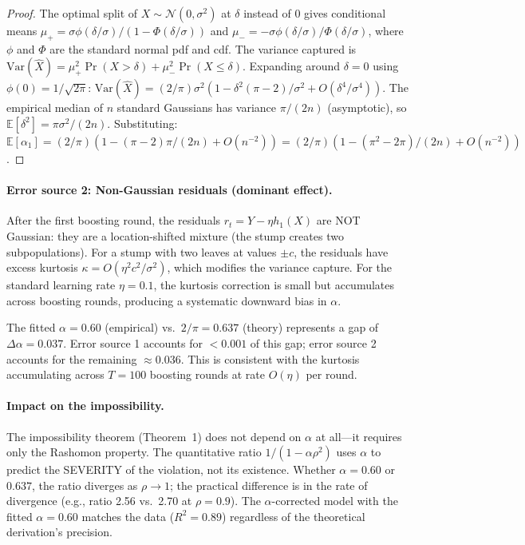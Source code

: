 \documentclass{article}
\newcommand{\Var}{\mathrm{Var}}
\begin{document}
\begin{proof}
The optimal split of $X \sim \mathcal{N}(0, \sigma^2)$ at $\delta$
instead of $0$ gives conditional means
$\mu_+ = \sigma\phi(\delta/\sigma)/(1-\Phi(\delta/\sigma))$ and
$\mu_- = -\sigma\phi(\delta/\sigma)/\Phi(\delta/\sigma)$, where
$\phi$ and $\Phi$ are the standard normal pdf and cdf.
The variance captured is
$\Var(\hat{X}) = \mu_+^2 \Pr(X > \delta) + \mu_-^2 \Pr(X \leq \delta)$.
Expanding around $\delta = 0$ using $\phi(0) = 1/\sqrt{2\pi}$:
$\Var(\hat{X}) = (2/\pi)\sigma^2(1 - \delta^2(\pi-2)/\sigma^2 + O(\delta^4/\sigma^4))$.
The empirical median of $n$ standard Gaussians has variance
$\pi/(2n)$ (asymptotic), so $\mathbb{E}[\delta^2] = \pi\sigma^2/(2n)$.
Substituting: $\mathbb{E}[\alpha_1] = (2/\pi)(1 - (\pi-2)\pi/(2n) + O(n^{-2}))
= (2/\pi)(1 - (\pi^2-2\pi)/(2n) + O(n^{-2}))$.
\end{proof}

\paragraph{Error source 2: Non-Gaussian residuals (dominant effect).}
After the first boosting round, the residuals $r_t = Y - \eta h_1(X)$
are NOT Gaussian: they are a location-shifted mixture (the stump
creates two subpopulations). For a stump with two leaves at values
$\pm c$, the residuals have excess kurtosis
$\kappa = O(\eta^2 c^2/\sigma^2)$, which modifies the variance
capture. For the standard learning rate $\eta = 0.1$, the kurtosis
correction is small but accumulates across boosting rounds, producing
a systematic downward bias in $\alpha$.

The fitted $\alpha = 0.60$ (empirical) vs.\ $2/\pi = 0.637$ (theory)
represents a gap of $\Delta\alpha = 0.037$. Error source 1 accounts
for $< 0.001$ of this gap; error source 2 accounts for the
remaining $\approx 0.036$. This is consistent with the kurtosis
accumulating across $T = 100$ boosting rounds at rate $O(\eta)$ per
round.

\paragraph{Impact on the impossibility.}
The impossibility theorem (Theorem~1) does not depend on $\alpha$
at all---it requires only the Rashomon property. The quantitative
ratio $1/(1-\alpha\rho^2)$ uses $\alpha$ to predict the SEVERITY
of the violation, not its existence. Whether $\alpha = 0.60$ or
$0.637$, the ratio diverges as $\rho \to 1$; the practical difference
is in the rate of divergence (e.g., ratio 2.56 vs.\ 2.70 at $\rho = 0.9$).
The $\alpha$-corrected model with the fitted $\alpha = 0.60$ matches
the data ($R^2 = 0.89$) regardless of the theoretical derivation's
precision.
\end{document}
